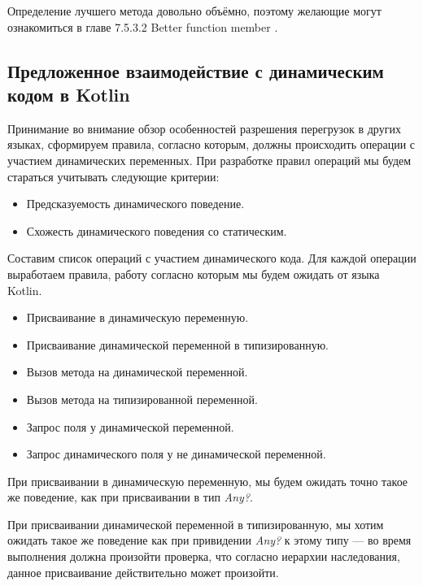 Определение лучшего метода довольно объёмно, поэтому желающие могут ознакомиться в главе 7.5.3.2 Better function member \cite{csharp:languageSpecification}.


\subsection{Предложенное взаимодействие с динамическим кодом в Kotlin}

Принимание во внимание обзор особенностей разрешения перегрузок в других языках, сформируем правила, согласно которым, должны происходить операции с участием динамических переменных. При разработке правил операций мы будем стараться учитывать следующие критерии:

\begin{itemize}
    \item Предсказуемость динамического поведение.
    \item Схожесть динамического поведения со статическим.
\end{itemize}

Составим список операций с участием динамического кода. Для каждой операции выработаем правила, работу согласно которым мы будем ожидать от языка Kotlin.

\begin{itemize}
    \item Присваивание в динамическую переменную.
    \item Присваивание динамической переменной в типизированную.
    \item Вызов метода на динамической переменной.
    \item Вызов метода на типизированной переменной.
    \item Запрос поля у динамической переменной.
    \item Запрос динамического поля у не динамической переменной.
\end{itemize}

При присваивании в динамическую переменную, мы будем ожидать точно такое же поведение, как при присваивании в тип \textit{Any?}.

При присваивании динамической переменной в типизированную, мы хотим ожидать такое же поведение как при привидении \textit{Any?} к этому типу --- во время выполнения должна произойти проверка, что согласно иерархии наследования, данное присваивание действительно может произойти.%

